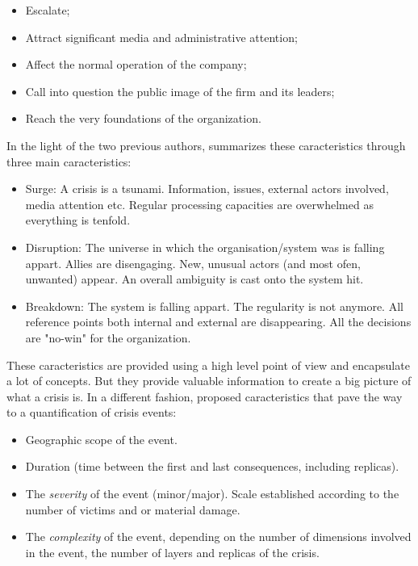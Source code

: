 \begin{itemize}
    \item Escalate;
    \item Attract significant media and administrative attention;
    \item Affect the normal operation of the company;
    \item Call into question the public image of the firm and its leaders;
    \item Reach the very foundations of the organization.
\end{itemize}

In the light of the two previous authors, \textcite{lagadecGESTIONCRISES1994} summarizes these caracteristics through three main caracteristics:

\begin{itemize}
    \item Surge: A crisis is a tsunami. Information, issues, external actors involved, media attention etc.
          Regular processing capacities are overwhelmed as everything is tenfold.
    \item Disruption: The universe in which the organisation/system was is falling appart. Allies are disengaging. New, unusual actors (and most ofen, unwanted) appear.
          An overall ambiguity is cast onto the system hit.
    \item Breakdown: The system is falling appart. The regularity is not anymore. All reference points both internal and external are disappearing.
          All the decisions are "no-win" for the organization.
\end{itemize}

These caracteristics are provided using a high level point of view and encapsulate a lot of concepts.
But they provide valuable information to create a big picture of what a crisis is.
In a different fashion, \textcite{fertierInterpretationAutomatiqueDonnees2018} proposed caracteristics that pave the way to a quantification of crisis events:

\begin{itemize}
    \item Geographic scope of the event.
    \item Duration (time between the first and last consequences, including replicas).
    \item The \emph{severity} of the event (minor/major). Scale established according to the number of victims and or material damage.
    \item The \emph{complexity} of the event, depending on the number of dimensions involved in the event, the number of layers and replicas of the crisis.
\end{itemize}

